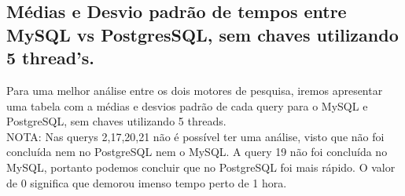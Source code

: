 \documentclass{article}
\begin{document}
  \clearpage

  \subsection{Médias e Desvio padrão de tempos entre MySQL vs PostgresSQL, sem chaves utilizando 5 thread's.}

  \quad Para uma melhor análise entre os dois motores de pesquisa, iremos apresentar uma tabela com a médias e desvios padrão de cada query para o MySQL e PostgreSQL, sem chaves utilizando 5 threads. \\
NOTA: Nas querys 2,17,20,21 não é possível ter uma análise, visto que não foi concluída nem no PostgreSQL nem o MySQL. A query 19 não foi concluída no MySQL, portanto podemos concluir que no PostgreSQL foi mais rápido. O valor de 0 significa que demorou imenso tempo perto de 1 hora.
\end{document}
